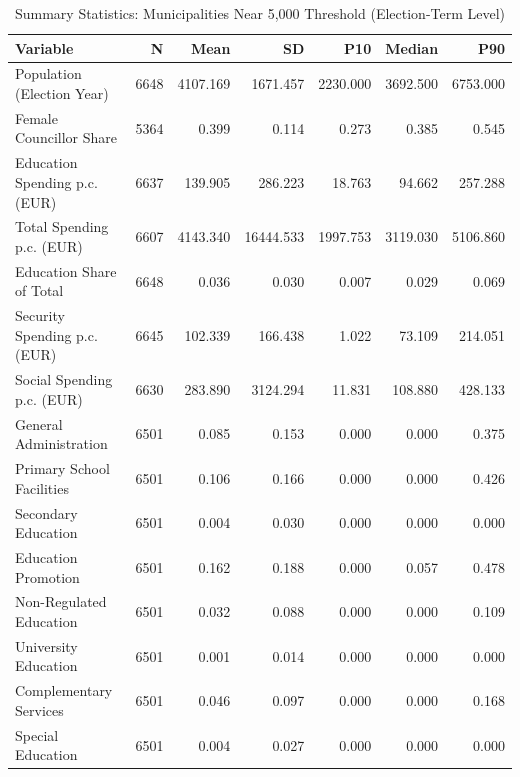 \begin{table}[!h]
\centering
\small
\centering
\caption{\label{tab:summary}Summary Statistics: Municipalities Near 5,000 Threshold (Election-Term Level)}
\centering
\begin{tabular}[t]{lrrrrrr}
\toprule
Variable & N & Mean & SD & P10 & Median & P90\\
\midrule
Population (Election Year) & 6648 & 4107.169 & 1671.457 & 2230.000 & 3692.500 & 6753.000\\
Female Councillor Share & 5364 & 0.399 & 0.114 & 0.273 & 0.385 & 0.545\\
Education Spending p.c. (EUR) & 6637 & 139.905 & 286.223 & 18.763 & 94.662 & 257.288\\
Total Spending p.c. (EUR) & 6607 & 4143.340 & 16444.533 & 1997.753 & 3119.030 & 5106.860\\
Education Share of Total & 6648 & 0.036 & 0.030 & 0.007 & 0.029 & 0.069\\
\addlinespace
Security Spending p.c. (EUR) & 6645 & 102.339 & 166.438 & 1.022 & 73.109 & 214.051\\
Social Spending p.c. (EUR) & 6630 & 283.890 & 3124.294 & 11.831 & 108.880 & 428.133\\
General Administration & 6501 & 0.085 & 0.153 & 0.000 & 0.000 & 0.375\\
Primary School Facilities & 6501 & 0.106 & 0.166 & 0.000 & 0.000 & 0.426\\
Secondary Education & 6501 & 0.004 & 0.030 & 0.000 & 0.000 & 0.000\\
\addlinespace
Education Promotion & 6501 & 0.162 & 0.188 & 0.000 & 0.057 & 0.478\\
Non-Regulated Education & 6501 & 0.032 & 0.088 & 0.000 & 0.000 & 0.109\\
University Education & 6501 & 0.001 & 0.014 & 0.000 & 0.000 & 0.000\\
Complementary Services & 6501 & 0.046 & 0.097 & 0.000 & 0.000 & 0.168\\
Special Education & 6501 & 0.004 & 0.027 & 0.000 & 0.000 & 0.000\\
\bottomrule
\end{tabular}
\end{table}
